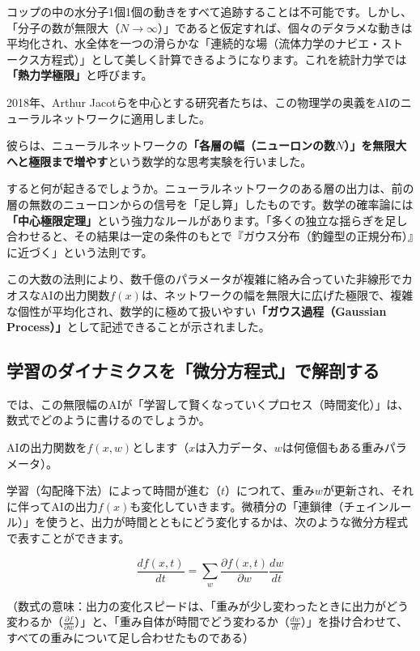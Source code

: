 コップの中の水分子1個1個の動きをすべて追跡することは不可能です。しかし、「分子の数が無限大（\(N \to \infty\)）」であると仮定すれば、個々のデタラメな動きは平均化され、水全体を一つの滑らかな「連続的な場（流体力学のナビエ・ストークス方程式）」として美しく計算できるようになります。これを統計力学では\textbf{「熱力学極限」}と呼びます。

2018年、Arthur Jacotらを中心とする研究者たちは、この物理学の奥義をAIのニューラルネットワークに適用しました。

彼らは、ニューラルネットワークの\textbf{「各層の幅（ニューロンの数\(N\)）」を無限大へと極限まで増やす}という数学的な思考実験を行いました。

すると何が起きるでしょうか。ニューラルネットワークのある層の出力は、前の層の無数のニューロンからの信号を「足し算」したものです。数学の確率論には\textbf{「中心極限定理」}という強力なルールがあります。「多くの独立な揺らぎを足し合わせると、その結果は一定の条件のもとで『ガウス分布（釣鐘型の正規分布）』に近づく」という法則です。

この大数の法則により、数千億のパラメータが複雑に絡み合っていた非線形でカオスなAIの出力関数\(f(x)\)は、ネットワークの幅を無限大に広げた極限で、複雑な個性が平均化され、数学的に極めて扱いやすい\textbf{「ガウス過程（Gaussian Process）」}として記述できることが示されました。

\subsection{学習のダイナミクスを「微分方程式」で解剖する}

では、この無限幅のAIが「学習して賢くなっていくプロセス（時間変化）」は、数式でどのように書けるのでしょうか。

AIの出力関数を\(f(x, w)\)とします（\(x\)は入力データ、\(w\)は何億個もある重みパラメータ）。

学習（勾配降下法）によって時間が進む（\(t\)）につれて、重み\(w\)が更新され、それに伴ってAIの出力\(f(x)\)も変化していきます。微積分の「連鎖律（チェインルール）」を使うと、出力が時間とともにどう変化するかは、次のような微分方程式で表すことができます。

\[\frac{df(x, t)}{dt} = \sum_{w} \frac{\partial f(x, t)}{\partial w} \frac{dw}{dt}\]

（数式の意味：出力の変化スピードは、「重みが少し変わったときに出力がどう変わるか（\(\frac{\partial f}{\partial w}\)）」と、「重み自体が時間でどう変わるか（\(\frac{dw}{dt}\)）」を掛け合わせて、すべての重みについて足し合わせたものである）

